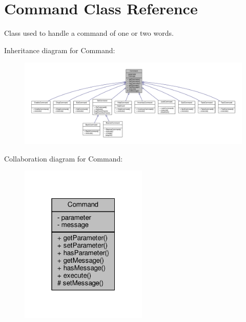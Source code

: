 \hypertarget{classCommand}{\section{Command Class Reference}
\label{classCommand}
}


Class used to handle a command of one or two words.  




Inheritance diagram for Command\-:
\nopagebreak
\begin{figure}[H]
\begin{center}
\leavevmode
\includegraphics[width=350pt]{classCommand__inherit__graph}
\end{center}
\end{figure}


Collaboration diagram for Command\-:
\nopagebreak
\begin{figure}[H]
\begin{center}
\leavevmode
\includegraphics[width=172pt]{classCommand__coll__graph}
\end{center}
\end{figure}
